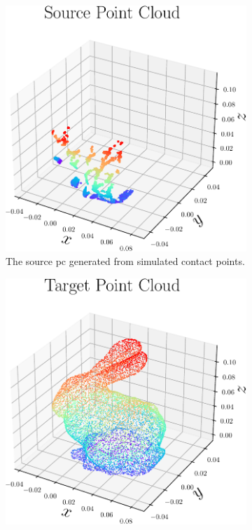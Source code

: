 \begin{figure}[!h]
	\centering
	\begin{subfigure}[b]{0.3\textwidth}
		\centering
		\includegraphics[width=\textwidth]{chapters/1-tactile-perception/fig/matplotlib/pc_source.pdf}
		\caption{The source \gls{pc} generated from simulated contact points.}
		\label{fig:pc-source}
	\end{subfigure}
	\begin{subfigure}[b]{0.3\textwidth}
		\centering
		\includegraphics[width=\textwidth]{chapters/1-tactile-perception/fig/matplotlib/pc_target.pdf}

\end{subfigure}
\end{figure}
